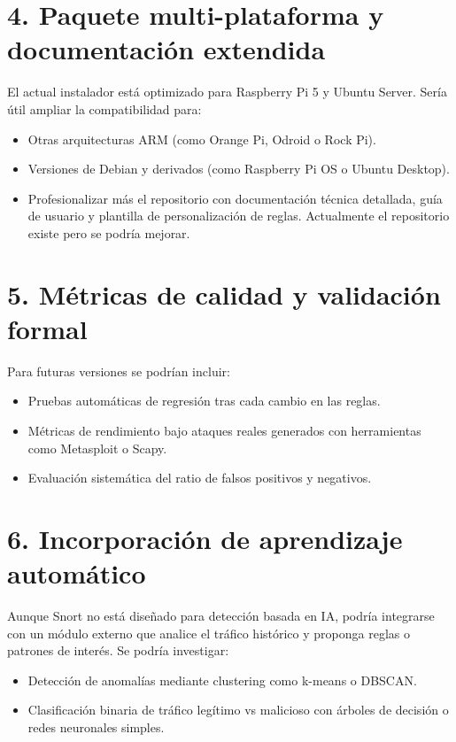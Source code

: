 \documentclass[11pt,a4paper,twoside]{report}
\begin{document}
\section*{4. Paquete multi-plataforma y documentación extendida}

El actual instalador está optimizado para Raspberry Pi 5 y Ubuntu Server. Sería útil ampliar la compatibilidad para:

\begin{itemize}
	\item Otras arquitecturas ARM (como Orange Pi, Odroid o Rock Pi).
	\item Versiones de Debian y derivados (como Raspberry Pi OS o Ubuntu Desktop).
	\item Profesionalizar más el repositorio con documentación técnica detallada, guía de usuario y plantilla de personalización de reglas. Actualmente el repositorio existe pero se podría mejorar.
\end{itemize}

\section*{5. Métricas de calidad y validación formal}

Para futuras versiones se podrían incluir:

\begin{itemize}
	\item Pruebas automáticas de regresión tras cada cambio en las reglas.
	\item Métricas de rendimiento bajo ataques reales generados con herramientas como Metasploit o Scapy.
	\item Evaluación sistemática del ratio de falsos positivos y negativos.
\end{itemize}

\section*{6. Incorporación de aprendizaje automático}

Aunque Snort no está diseñado para detección basada en IA, podría integrarse con un módulo externo que analice el tráfico histórico y proponga reglas o patrones de interés. Se podría investigar:

\begin{itemize}
	\item Detección de anomalías mediante clustering como k-means o DBSCAN.
	\item Clasificación binaria de tráfico legítimo vs malicioso con árboles de decisión o redes neuronales simples.
\end{itemize}
\end{document}
